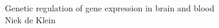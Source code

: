 \clearpage
{}

\restoregeometry
\clearpage

\noindent


\vspace{8cm}
\fontsize{40}{50}\selectfont  Genetic regulation of gene expression in brain and blood \\


\vspace{5cm}
\fontsize{25}{35}\selectfont 
\hfill Niek de Klein
\normalsize

\newpage
